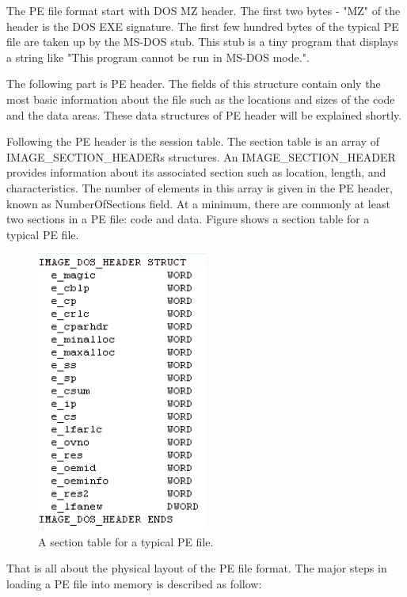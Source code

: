 The PE file format start with DOS MZ header. The first two bytes - "MZ" of the header is the DOS EXE signature. The first few hundred bytes of the typical PE file are taken up by the MS-DOS stub. This stub is a tiny program that displays a string like "This program cannot be run in MS-DOS mode.". 

The following part is PE header. The fields of this structure contain only the most basic information about the file such as the locations and sizes of the code and the data areas. These data structures of PE header will be explained shortly.

Following the PE header is the session table. The section table is an array of IMAGE\_SECTION\_HEADERs structures. An IMAGE\_SECTION\_HEADER provides information about its associated section such as location, length, and characteristics. The number of elements in this array is given in the PE header, known as NumberOfSections field. At a minimum, there are commonly at least two sections in a PE file: code and data. Figure  shows a section table for a typical PE file.

\begin{figure}[h!]
\centering
\includegraphics[width=0.5\textwidth]{graph/dosHeaderStructure.png}
\caption{A section table for a typical PE file.}
\label{fig:pefiles}
\end{figure}

That is all about the physical layout of the PE file format. The major steps in loading a PE file into memory is described as follow:


